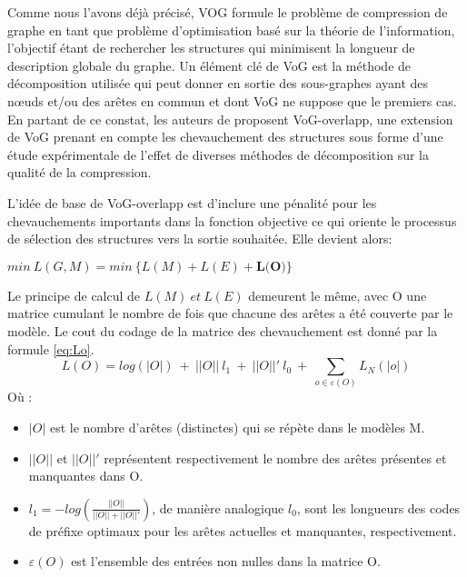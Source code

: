 			Comme nous l'avons déjà précisé, VOG formule le problème de compression de graphe en tant que problème d'optimisation basé sur la théorie de l'information, l'objectif étant de rechercher les structures  qui minimisent la longueur de description globale du graphe. Un élément clé de VoG est la méthode de décomposition utilisée qui peut donner en sortie des sous-graphes ayant des nœuds et/ou des arêtes en commun et dont VoG\citep{koutra2015summarizing} ne suppose que le premiers cas. 
			En partant de ce constat, les auteurs de \citep{liu2015empirical} proposent VoG-overlapp, une extension de VoG prenant en compte les chevauchement des structures sous forme d'une étude expérimentale de l'effet de diverses méthodes de décomposition sur la qualité de la compression.
			
			L'idée de base de VoG-overlapp est d'inclure une pénalité pour les chevauchements importants dans la fonction objective ce qui oriente le processus de sélection des structures vers la sortie souhaitée. Elle devient alors:
			\begin{center}
				$min\ L(G,M) = min\ \big\{L(M) + L(E) +\textbf{L(O)}\big\}$
			\end{center}
			
			Le principe de calcul de $L(M)\ et\ L(E)$ demeurent le même, avec O une matrice cumulant le nombre de fois que chacune des arêtes a été couverte par le modèle. Le cout du codage de la matrice des chevauchement est donné par la formule \eqref{eq:Lo}.
			\begin{equation} \label{eq:Lo}
				L(O) = log(|O|)\ +\ ||O||\ l_{1}\ +\ ||O||'\ l_{0}\ +\  \displaystyle{\sum_{o\in\varepsilon(O)}L_{N}(|o|)}
			\end{equation}
			Où :
			\begin{itemize}[label=$\circ$]
				\item $|O|$  est le nombre d'arêtes (distinctes) qui se répète dans le modèles M. 
				\item $||O||$ et $||O||'$ représentent respectivement le nombre des arêtes présentes et manquantes dans O.
				\item $l_{1} = -log (\frac{||O||}{||O||+||O||'})$, de manière analogique $l_{0}$, sont les longueurs des codes de préfixe optimaux pour les arêtes actuelles et manquantes, respectivement.
				\item $\varepsilon(O)$  est l'ensemble des entrées non nulles dans la matrice O.
			\end{itemize}